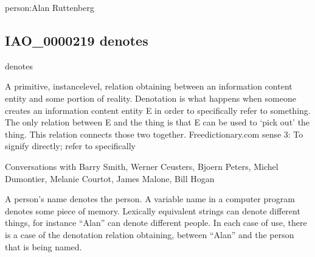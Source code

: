 \documentclass[letterpaper,10pt,english]{sphinxmanual}
\begin{document}
\begin{sphinxShadowBox}

\sphinxAtStartPar
person:Alan Ruttenberg
\end{sphinxShadowBox}
\begin{quote}

\ignorespaces \end{quote}


\subsection{IAO\_0000219 \sphinxhyphen{} denotes}
\label{\detokenize{doc-IAO_0000219:iao-0000219-denotes}}\label{\detokenize{doc-IAO_0000219:index-0}}\label{\detokenize{doc-IAO_0000219::doc}}
\begin{sphinxShadowBox}

\sphinxAtStartPar
denotes
\end{sphinxShadowBox}

\begin{sphinxShadowBox}

\sphinxAtStartPar
A primitive, instance\sphinxhyphen{}level, relation obtaining between an information content entity and some portion of reality. Denotation is what happens when someone creates an information content entity E in order to specifically refer to something. The only relation between E and the thing is that E can be used to ‘pick out’ the thing. This relation connects those two together. Freedictionary.com sense 3: To signify directly; refer to specifically
\end{sphinxShadowBox}

\begin{sphinxShadowBox}

\sphinxAtStartPar
Conversations with Barry Smith, Werner Ceusters, Bjoern Peters, Michel Dumontier, Melanie Courtot, James Malone, Bill Hogan
\end{sphinxShadowBox}

\begin{sphinxShadowBox}

\sphinxAtStartPar
A person’s name denotes the person. A variable name in a computer program denotes some piece of memory. Lexically equivalent strings can denote different things, for instance “Alan” can denote different people. In each case of use, there is a case of the denotation relation obtaining, between “Alan” and the person that is being named.
\end{sphinxShadowBox}
\end{document}
